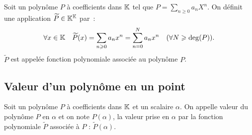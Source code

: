 \begin{defdef}
  Soit un polynôme \(P\) à coefficients dans \(\mathbb{K}\) tel que \(P = \sum_{n 
  \geqslant 0}a_n X^n\). On définit une application \(\widetilde{P} \in \mathbb{K}^{\mathbb{K}}\) 
  par~:
  \begin{equation}
    \forall x \in \mathbb{K} \quad \widetilde{P}(x) = \sum_{n \geqslant 0} a_n 
    x^n = \sum_{n = 0}^N a_n x^n \quad (\forall N \geqslant \deg(P)).
  \end{equation}
  \(\widetilde{P}\) est appelée fonction polynomiale associée au polynôme \(P\).
\end{defdef}

\subsection{Valeur d'un polynôme en un point}

\begin{defdef}
  Soit un polynôme \(P\) à coefficients dans \(\mathbb{K}\) et un scalaire \(\alpha\). 
  On appelle valeur du polynôme \(P\) en \(\alpha\) et on note \(P(\alpha)\), la 
  valeur prise en \(\alpha\) par la fonction polynomiale \(\widetilde{P}\) 
  associée à \(P\) : \(\widetilde{P}(\alpha)\).
\end{defdef}

